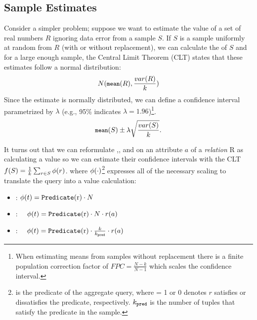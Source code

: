 \vspace{.25em}

\subsection{Sample Estimates}\label{subsec:resultestimation}
Consider a simpler problem; suppose we want to estimate the \mean value of a set of real numbers $R$ ignoring data error from a sample $S$.
If $S$ is a sample uniformly at random from $R$ (with or without replacement), we can calculate the \mean of $S$ and for a large enough sample, the Central Limit Theorem (CLT) states that these estimates follow a normal distribution:
\[\small
N(\texttt{mean} (R),\frac{var(R)}{k})
\]
Since the estimate is normally distributed, we can define a confidence interval parametrized by $\lambda$ (e.g., 95\% indicates $\lambda=1.96$)\footnote{\scriptsize When estimating means from samples without replacement there is a finite population correction factor of $FPC=\frac{N-k}{N-1}$ which scales the confidence interval.}.
\begin{equation}\small
\texttt{mean} (S) \pm \lambda \sqrt{\frac{var(S)}{k}}.
\end{equation}

It turns out that we can reformulate \sumfunc,\countfunc, and \avgfunc on an attribute $a$ of a \emph{relation} R as calculating a \mean value so we can estimate their confidence intervals with the CLT 
$
f(S) = \frac{1}{k} \sum_{r \in S} \phi (r)
$.
where $\phi (\cdot)$\footnote{ is the predicate of the aggregate query, where  = 1 or 0 denotes $r$ satisfies or dissatisfies the predicate, respectively. $k_{\texttt{pred} }$ is the number of tuples that satisfy the predicate in the sample.} expresses all of the necessary scaling to translate the query into a \mean value calculation:
\begin{itemize}\vspace{-.5em}
\item \countfunc: $\saqpfunc(t) = \Predicate{r} \cdot N$\vspace{-.5em}
\item \sumfunc: ~\, $\saqpfunc(t) = \Predicate{r} \cdot N \cdot r(a)$\vspace{-.5em}
\item \avgfunc: ~\, $\saqpfunc(t) = \Predicate{r} \cdot \frac{k}{k_{\pred}}  \cdot r(a) $ 
\end{itemize}

